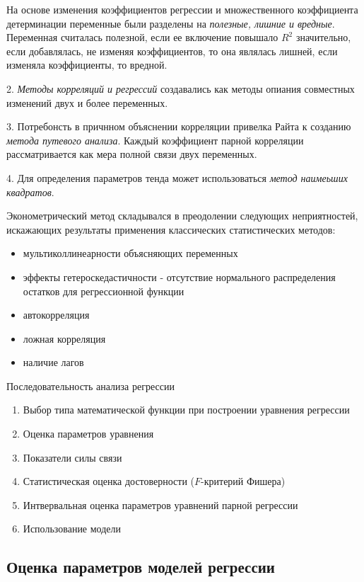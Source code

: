 \documentclass[aps,%
12pt,%
final,%
oneside,
onecolumn,%
musixtex, %
superscriptaddress,%
centertags]{article} %
\theoremstyle{plain}
\theoremstyle{definition}
\theoremstyle{remark}
\begin{document}
На основе изменения коэффициентов регрессии и множественного коэффициента детерминации переменные были разделены на \textit{полезные, лишние и вредные}. Переменная считалась полезной, если ее включение повышало $R^2$ значительно, если добавлялась, не изменяя коэффициентов, то она являлась лишней, если изменяла коэффициенты, то вредной.

2. \textit{Методы корреляций и регрессий} создавались как методы опиания совместных изменений двух и более переменных. 

3. Потребонсть в причнном объяснении корреляции привелка Райта к созданию \textit{метода путевого анализа}. Каждый коэффициент парной корреляции рассматривается как мера полной связи двух переменных.

4. Для определения параметров тенда может использоваться \textit{метод наимеьших квадратов}.

Эконометрический метод складывался в преодолении следующих неприятностей, искажающих результаты применения классических статистических методов:

\begin{itemize}
	\item мультиколлинеарности объясняющих переменных
	\item эффекты гетероскедастичности - отсутствие нормального распределения остатков для регрессионной функции
	\item автокорреляция
	\item ложная корреляция
	\item наличие лагов
\end{itemize}

Последовательность анализа регрессии
\begin{enumerate}
	\item Выбор типа математической функции при построении уравнения регрессии
	\item Оценка параметров уравнения
	\item Показатели силы связи
	\item Статистическая оценка достоверности ($F$-критерий Фишера)
	\item Интвервальная оценка параметров уравнений парной регрессии
	\item Использование модели
\end{enumerate}
\newpage
\subsection{Оценка параметров моделей регрессии}
\end{document}

